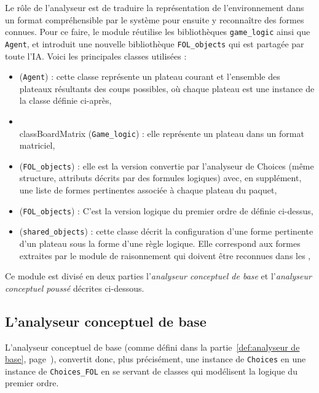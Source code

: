 Le rôle de l'analyseur est de traduire la représentation de l'environnement dans un format compréhensible par le système pour ensuite y reconnaître des formes connues. Pour ce faire, le module réutilise les bibliothèques \texttt{game\_logic} ainsi que \texttt{Agent}, et introduit une nouvelle bibliothèque \texttt{FOL\_objects} qui est partagée par toute l'IA. Voici les principales classes utilisées :

\begin{itemize}
  \item {} (\texttt{Agent}) : cette classe représente un plateau courant et l'ensemble des plateaux résultants des coups possibles, où chaque plateau est une instance de la classe  définie ci-après,
  \item \\class{BoardMatrix} (\texttt{Game\_logic}) : elle représente un plateau dans un format matriciel,
  \item {} (\texttt{FOL\_objects}) : elle est la version convertie par l'analyseur de Choices (même structure, attributs décrits par des formules logiques) avec, en supplément, une liste de formes pertinentes associée à chaque plateau du paquet,
  \item {} (\texttt{FOL\_objects}) : C'est la version logique du premier ordre de
   définie ci-dessus,
  \item {} (\texttt{shared\_objects}) : cette classe décrit la configuration d'une forme pertinente d'un plateau sous la forme d'une règle logique. Elle correspond aux formes extraites par le module de raisonnement qui doivent être reconnues dans les ,
\end{itemize}

Ce module est divisé en deux parties l'\emph{analyseur conceptuel de base} et l'\emph{analyseur conceptuel poussé} décrites ci-dessous.
 
\subsection{L'analyseur conceptuel de base}
L'analyseur conceptuel de base (comme défini dans la partie~\ref{def:analyseur de base}, page~\pageref{def:analyseur de base}), convertit donc, plus précisément, une instance de \texttt{Choices} en une instance de \texttt{Choices\_FOL} en se servant de classes qui modélisent la logique du premier ordre. 

